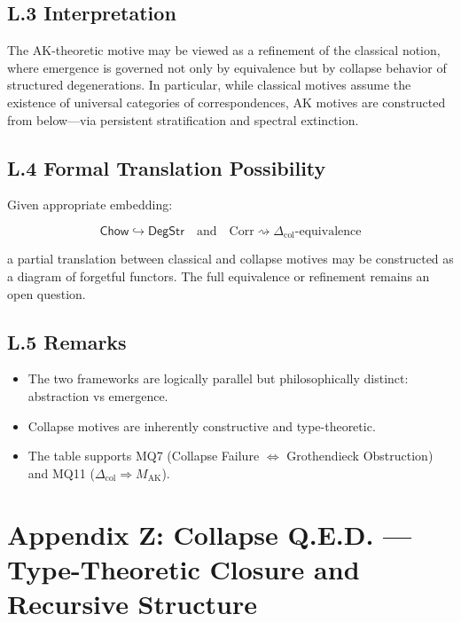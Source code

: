 \documentclass[11pt]{article}
\begin{document}
\subsection*{L.3 Interpretation}

The AK-theoretic motive may be viewed as a refinement of the classical notion, where emergence is governed not only by equivalence but by collapse behavior of structured degenerations. In particular, while classical motives assume the existence of universal categories of correspondences, AK motives are constructed from below—via persistent stratification and spectral extinction.

\subsection*{L.4 Formal Translation Possibility}

Given appropriate embedding:

\[
\mathsf{Chow} \hookrightarrow \mathsf{DegStr}
\quad \text{and} \quad
\mathrm{Corr} \rightsquigarrow \Delta_{\mathrm{col}} \text{-equivalence}
\]

a partial translation between classical and collapse motives may be constructed as a diagram of forgetful functors. The full equivalence or refinement remains an open question.

\subsection*{L.5 Remarks}

\begin{itemize}
  \item The two frameworks are logically parallel but philosophically distinct: abstraction vs emergence.
  \item Collapse motives are inherently constructive and type-theoretic.
  \item The table supports MQ7 (Collapse Failure $\iff$ Grothendieck Obstruction) and MQ11 ($\Delta_{\mathrm{col}} \Rightarrow M_{\mathrm{AK}}$).
\end{itemize}

\FloatBarrier




\section*{Appendix Z: Collapse Q.E.D. — Type-Theoretic Closure and Recursive Structure}
\end{document}
